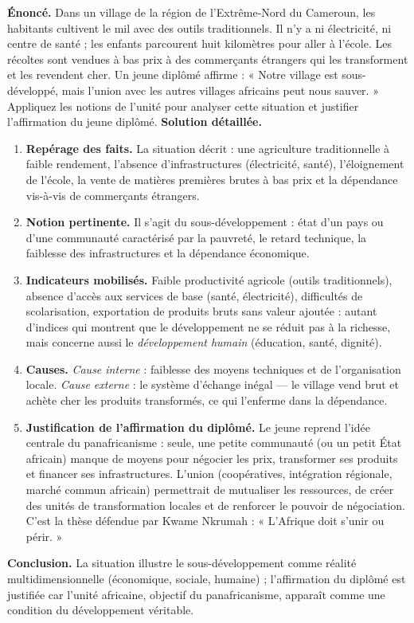 \documentclass[11pt]{article}
\newcommand{\cle}[1]{{\popxbold\color{popdark}#1}}
\begin{document}
\begin{exoresolu}
\textbf{Énoncé.} Dans un village de la région de l'Extrême-Nord du Cameroun, les habitants cultivent le mil avec des outils traditionnels. Il n'y a ni électricité, ni centre de santé ; les enfants parcourent huit kilomètres pour aller à l'école. Les récoltes sont vendues à bas prix à des commerçants étrangers qui les transforment et les revendent cher. Un jeune diplômé affirme : « Notre village est sous-développé, mais l'union avec les autres villages africains peut nous sauver. »
Appliquez les notions de l'unité pour analyser cette situation et justifier l'affirmation du jeune diplômé.
\tcblower
\textbf{Solution détaillée.}
\begin{enumerate}
\item \textbf{Repérage des faits.} La situation décrit : une agriculture traditionnelle à faible rendement, l'absence d'infrastructures (électricité, santé), l'éloignement de l'école, la vente de matières premières brutes à bas prix et la dépendance vis-à-vis de commerçants étrangers.
\item \textbf{Notion pertinente.} Il s'agit du \cle{sous-développement} : état d'un pays ou d'une communauté caractérisé par la pauvreté, le retard technique, la faiblesse des infrastructures et la dépendance économique.
\item \textbf{Indicateurs mobilisés.} Faible productivité agricole (outils traditionnels), absence d'accès aux services de base (santé, électricité), difficultés de scolarisation, exportation de produits bruts sans valeur ajoutée : autant d'indices qui montrent que le développement ne se réduit pas à la richesse, mais concerne aussi le \emph{développement humain} (éducation, santé, dignité).
\item \textbf{Causes.} \emph{Cause interne} : faiblesse des moyens techniques et de l'organisation locale. \emph{Cause externe} : le système d'échange inégal — le village vend brut et achète cher les produits transformés, ce qui l'enferme dans la dépendance.
\item \textbf{Justification de l'affirmation du diplômé.} Le jeune reprend l'idée centrale du \cle{panafricanisme} : seule, une petite communauté (ou un petit État africain) manque de moyens pour négocier les prix, transformer ses produits et financer ses infrastructures. L'union (coopératives, intégration régionale, marché commun africain) permettrait de mutualiser les ressources, de créer des unités de transformation locales et de renforcer le pouvoir de négociation. C'est la thèse défendue par Kwame Nkrumah : « L'Afrique doit s'unir ou périr. »
\end{enumerate}
\textbf{Conclusion.} La situation illustre le sous-développement comme réalité multidimensionnelle (économique, sociale, humaine) ; l'affirmation du diplômé est justifiée car l'unité africaine, objectif du panafricanisme, apparaît comme une condition du développement véritable.
\end{exoresolu}
\end{document}
